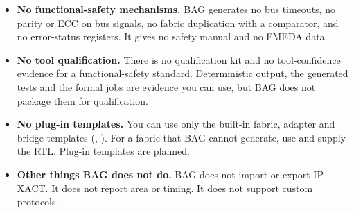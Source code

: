 \begin{itemize}
\item \textbf{No functional-safety mechanisms.} BAG generates no bus timeouts, no
  parity or ECC on bus signals, no fabric duplication with a comparator, and no
  error-status registers. It gives no safety manual and no FMEDA data.
\item \textbf{No tool qualification.} There is no qualification kit and no
  tool-confidence evidence for a functional-safety standard. Deterministic output, the
  generated tests and the formal jobs are evidence you can use, but BAG does not package
  them for qualification.
\item \textbf{No plug-in templates.} You can use only the built-in fabric, adapter and
  bridge templates (, ). For a fabric that BAG
  cannot generate, use  and supply the RTL. Plug-in templates are
  planned.
\item \textbf{Other things BAG does not do.} BAG does not import or export IP-XACT. It
  does not report area or timing. It does not support custom protocols.
\end{itemize}
